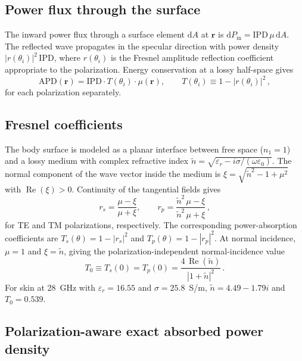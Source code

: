 \documentclass[journal,twocolumn,10pt]{IEEEtran}
\newcommand{\rr}{\mathbf{r}}
\newcommand{\IPD}{\mathrm{IPD}}
\newcommand{\APD}{\mathrm{APD}}
\newcommand{\ntilde}{\tilde{n}}
\newcommand{\diff}{\mathrm{d}}
\DeclareMathOperator{\RE}{Re}
\begin{document}
\subsection{Power flux through the surface}

The inward power flux through a surface element $\diff A$ at $\rr$
is $\diff P_{\mathrm{in}} = \IPD\,\mu\,\diff A$. The reflected wave
propagates in the specular direction with power density
$|r(\theta_i)|^2\,\IPD$, where $r(\theta_i)$ is the Fresnel amplitude
reflection coefficient appropriate to the polarization. Energy
conservation at a lossy half-space gives
\begin{equation}\label{eq:Sab-pol}
  \APD(\rr) = \IPD \cdot T(\theta_i) \cdot \mu(\rr),
  \qquad T(\theta_i) \equiv 1 - |r(\theta_i)|^2\, ,
\end{equation}
for each polarization separately.

\subsection{Fresnel coefficients}

The body surface is modeled as a planar interface between free
space ($n_1 = 1$) and a lossy medium with complex refractive index
$\ntilde = \sqrt{\varepsilon_r - i\sigma/(\omega\varepsilon_0)}$. The
normal component of the wave vector inside the medium is
$\xi = \sqrt{\ntilde^2 - 1 + \mu^2}$ with $\RE(\xi) > 0$. Continuity
of the tangential fields gives
\begin{equation}\label{eq:rs-rp}
  r_s = \frac{\mu - \xi}{\mu + \xi},
  \qquad
  r_p = \frac{\ntilde^2\,\mu - \xi}{\ntilde^2\,\mu + \xi}\, ,
\end{equation}
for TE and TM polarizations, respectively. The corresponding
power-absorption
coefficients are $T_s(\theta) = 1 - |r_s|^2$ and
$T_p(\theta) = 1 - |r_p|^2$. At normal incidence, $\mu = 1$ and
$\xi = \ntilde$, giving the polarization-independent normal-incidence value
\begin{equation}\label{eq:T0}
  T_0 \equiv T_s(0) = T_p(0) = \frac{4\,\RE(\ntilde)}{|1+\ntilde|^2}\, .
\end{equation}
For skin at 28~GHz with $\varepsilon_r = 16.55$ and
$\sigma = 25.8$~S/m, $\ntilde = 4.49 - 1.79i$ and $T_0 = 0.539$.

\subsection{Polarization-aware exact absorbed power density}\label{subsec:exact-law}
\end{document}

